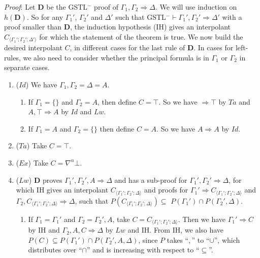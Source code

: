 \textit{Proof}: Let $\mathbf{D}$ be the GSTL$^-$ proof of $\Gamma_1 , \Gamma_2 \Rightarrow \Delta$. We will use induction on $h(\mathbf{D})$. So for any $\Gamma_1'$, $\Gamma_2'$ and $\Delta'$ such that GSTL$^-\vdash \Gamma_1' , \Gamma_2' \Rightarrow \Delta'$ with a proof smaller than $\mathbf{D}$, the induction hypothesis (IH) gives an interpolant $C_{\langle\Gamma_1'; \Gamma_2'; \Delta'\rangle}$ for which the statement of the theorem is true. We now build the desired interpolant $C$, in different cases for the last rule of $\mathbf{D}$. In cases for left-rules, we also need to consider whether the principal formula is in $\Gamma_1$ or $\Gamma_2$ in separate cases.
\begin{enumerate}
	\item ($Id$) We have $\Gamma_1,\Gamma_2 = \Delta = A$.
	\begin{enumerate}
		\item If $\Gamma_1 = \{\}$ and $\Gamma_2 = A$, then define $C = \top$. So we have $\Rightarrow \top$ by $Ta$ and $A , \top \Rightarrow A$ by $Id$ and $Lw$.
		
		\item If $\Gamma_1 = A$ and $\Gamma_2 = \{\}$ then define $C = A$. So we have $A \Rightarrow A$ by $Id$.
	\end{enumerate}
	\item ($Ta$) Take $C = \top$.
	
	\item ($Ex$) Take $C = \nabla^n \bot$.
	
	\item ($Lw$) $\mathbf{D}$ proves $\Gamma_1' , \Gamma_2' , A \Rightarrow \Delta$ and has a sub-proof for $\Gamma_1' , \Gamma_2' \Rightarrow \Delta$, for which IH gives an interpolant $C_{\langle\Gamma_1';\Gamma_2';\Delta\rangle}$ and proofs for $\Gamma_1' \Rightarrow C_{\langle\Gamma_1';\Gamma_2';\Delta\rangle}$ and $\Gamma_2 , C_{\langle\Gamma_1';\Gamma_2';\Delta\rangle} \Rightarrow \Delta$, such that $P(C_{\langle\Gamma_1';\Gamma_2';\Delta\rangle}) \subseteq$ $ P(\Gamma_1') \cap P(\Gamma_2' , \Delta)$.
	\begin{enumerate}
		\item If $\Gamma_1 = \Gamma_1'$ and $\Gamma_2 = \Gamma_2' , A$, take $C = C_{\langle\Gamma_1';\Gamma_2';\Delta\rangle}$. Then we have  $\Gamma_1' \Rightarrow C$ by IH and $\Gamma_2 , A , C \Rightarrow \Delta$ by $Lw$ and IH. From IH, we also have $P(C) \subseteq P(\Gamma_1') \cap P(\Gamma_2' , A , \Delta)$, since $P$ takes ``$,$'' to ``$\cup$'', which distributes over ``$\cap$'' and is increasing with respect to ``$\subseteq$''.
		

\end{enumerate}
\end{enumerate}
